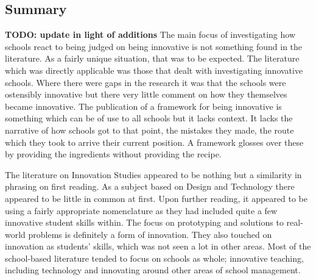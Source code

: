 \subsection{Summary}
\textbf{TODO: update in light of additions}
The main focus of investigating how schools react to being judged on being innovative is not something found in the literature. As a fairly unique situation, that was to be expected. The literature which was directly applicable was those that dealt with investigating innovative schools. Where there were gaps in the research it was that the schools were ostensibly innovative but there very little comment on how they themselves became innovative. The publication of a framework for being innovative is something which can be of use to all schools but it lacks context. It lacks the narrative of how schools got to that point, the mistakes they made, the route which they took to arrive their current position. A framework glosses over these by providing the ingredients without providing the recipe.

The literature on Innovation Studies appeared to be nothing but a similarity in phrasing on first reading. As a subject based on Design and Technology there appeared to be little in common at first. Upon further reading, it appeared to be using a fairly appropriate nomenclature as they had included quite a few innovative student skills within. The focus on prototyping and solutions to real-world problems is definitely a form of innovation. They also touched on innovation as students' skills, which was not seen a lot in other areas. Most of the school-based literature tended to focus on schools as whole; innovative teaching, including technology and innovating around other areas of school management. 



\cite{StopI4:online}